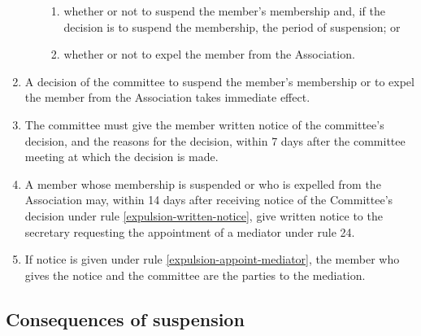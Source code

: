 \documentclass[../constitution.tex]{subfiles}
\begin{document}
\begin{enumerate}
\begin{enumerate}
\begin{enumerate}
    \item whether or not to suspend the member's membership and, if the decision is to suspend the membership, the period of suspension; or
    \item whether or not to expel the member from the Association.
    \end{enumerate}
  \end{enumerate}
\item A decision of the committee to suspend the member's membership or to expel the member from the Association takes immediate effect.
\item The committee must give the member written notice of the committee's decision, and the reasons for the decision, within 7 days after the committee meeting at which the decision is made. \label{expulsion-written-notice}
\item A member whose membership is suspended or who is expelled from the Association may, within 14 days after receiving notice of the Committee's decision under rule \ref{expulsion-written-notice}, give written notice to the secretary requesting the appointment of a mediator under rule 24. \label{expulsion-appoint-mediator}
\item If notice is given under rule \ref{expulsion-appoint-mediator}, the member who gives the notice and the committee are the parties to the mediation.
\end{enumerate}

\hypertarget{consequences-of-suspension}{%
\subsection{Consequences of suspension}\label{consequences-of-suspension}}
\end{document}
